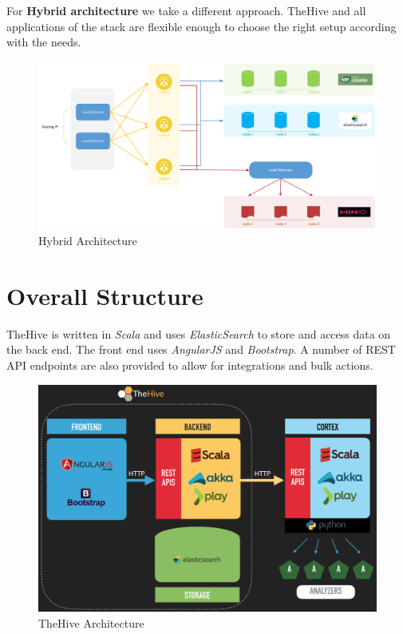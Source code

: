 \documentclass{book}
\begin{document}
\newpage
For \textbf{Hybrid architecture} we take a different approach. TheHive and all applications of the stack are flexible enough to choose the right setup according with the needs.
\begin{figure}[h]
    \centering
    \includegraphics[scale=.5]{Introductory Images/cluster server.png}
    \caption{Hybrid Architecture}
    \label{fig:hybridarc}
\end{figure}

\newpage

\section{Overall Structure}
TheHive is written in \textit{Scala} and uses \textit{ElasticSearch} to store and access data on the back end. The front end uses \textit{AngularJS} and \textit{Bootstrap}. A number of REST API endpoints are also provided to allow for integrations and bulk actions.
\newline
\begin{figure}[h]
    \centering
    \includegraphics[scale=0.7]{Introductory Images/hive_arch-1024x687.png}
    \caption{TheHive Architecture}
    \label{fig:overallarch}
\end{figure}
\end{document}

